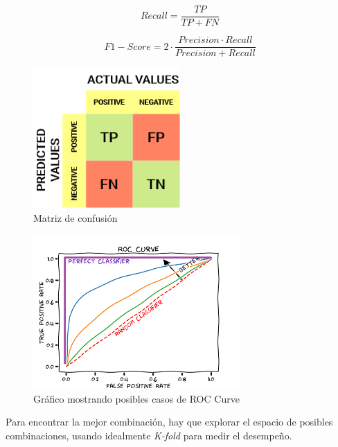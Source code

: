 \documentclass[titlepage,a4paper]{article}
\begin{document}
\begin{equation}
    Recall = \frac{TP}{TP+FN}
\end{equation}

\begin{equation}
    F1-Score = 2 \cdot \frac{Precision \cdot Recall}{Precision + Recall}
\end{equation}

\begin{figure}[!htb]
    \centering
    \includegraphics[width=0.5\textwidth]{imagenesResumen/MatrizDeConfusion.png}
    \caption{Matriz de confusión}
    \label{MatrizDeConfusion}
\end{figure}

\begin{figure}[!htb]
    \centering
    \includegraphics[width=0.7\textwidth]{imagenesResumen/ROCCurve.png}
    \caption{Gráfico mostrando posibles casos de ROC Curve}
    \label{ROCCurve}
\end{figure}



Para encontrar la mejor combinación, hay que explorar el espacio de posibles combinaciones, usando idealmente \textit{K-fold} para medir el desempeño.

\newpage
\end{document}
